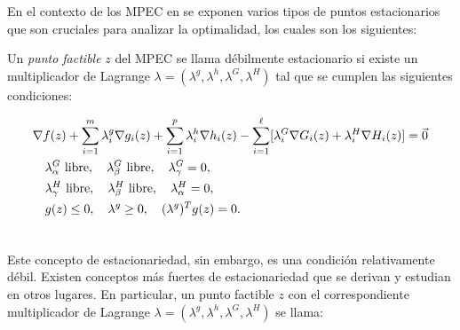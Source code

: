 En el contexto de los MPEC en \cite{Flegel2003AFJ} se exponen varios tipos de puntos estacionarios que son cruciales para analizar la optimalidad, los cuales son los siguientes:
\begin{definition}
    Un \textit{punto factible} $z$ del MPEC se llama débilmente estacionario si existe un multiplicador de Lagrange $\lambda = (\lambda^g, \lambda^h, \lambda^G, \lambda^H)$ tal que se cumplen las siguientes condiciones:
    
\begin{align}
& \nabla f(z) + \sum_{i=1}^m \lambda_i^g\nabla g_i(z) + \sum_{i=1}^p \lambda_i^h\nabla h_i(z) - \sum_{i=1}^{\ell} [\lambda_i^G\nabla G_i(z) + \lambda_i^H\nabla H_i(z)] = \vec{0} \notag\\
    & \quad \begin{aligned}
        & \lambda_\alpha^G \text{ libre}, \quad \lambda_\beta^G \text{ libre}, \quad \lambda_\gamma^G = 0, \\
        & \lambda_\gamma^H \text{ libre}, \quad \lambda_\beta^H \text{ libre}, \quad \lambda_\alpha^H = 0, \\
        & g(z) \leq 0, \quad \lambda^g \geq 0, \quad (\lambda^g)^T g(z) = 0.
    \end{aligned} \\
& \label{eq:Definicion_punto_debilemente_estacionario} \notag
\end{align}
\end{definition}

Este concepto de estacionariedad, sin embargo, es una condición relativamente débil. Existen conceptos más fuertes de estacionariedad que se derivan y estudian en otros lugares. En particular, un punto factible $z$ con el correspondiente multiplicador de Lagrange $\lambda = (\lambda^g, \lambda^h, \lambda^G, \lambda^H)$ se llama:

